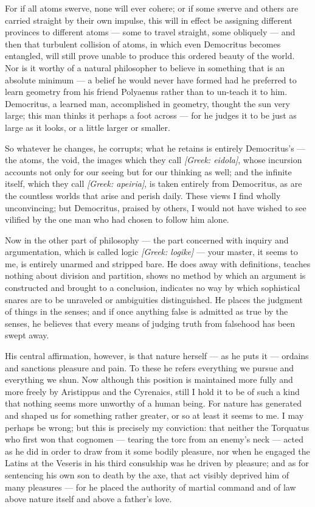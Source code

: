 For if all atoms swerve, none will ever cohere; or if some swerve and others are carried straight by their own impulse, this will in effect be assigning different provinces to different atoms — some to travel straight, some obliquely — and then that turbulent collision of atoms, in which even Democritus becomes entangled, will still prove unable to produce this ordered beauty of the world. Nor is it worthy of a natural philosopher to believe in something that is an absolute minimum — a belief he would never have formed had he preferred to learn geometry from his friend Polyaenus rather than to un-teach it to him. Democritus, a learned man, accomplished in geometry, thought the sun very large; this man thinks it perhaps a foot across — for he judges it to be just as large as it looks, or a little larger or smaller.

 So whatever he changes, he corrupts; what he retains is entirely Democritus's — the atoms, the void, the images which they call \textit{[Greek: eidola]}, whose incursion accounts not only for our seeing but for our thinking as well; and the infinite itself, which they call \textit{[Greek: apeiria]}, is taken entirely from Democritus, as are the countless worlds that arise and perish daily. These views I find wholly unconvincing; but Democritus, praised by others, I would not have wished to see vilified by the one man who had chosen to follow him alone.

 Now in the other part of philosophy — the part concerned with inquiry and argumentation, which is called logic \textit{[Greek: logike]} — your master, it seems to me, is entirely unarmed and stripped bare. He does away with definitions, teaches nothing about division and partition, shows no method by which an argument is constructed and brought to a conclusion, indicates no way by which sophistical snares are to be unraveled or ambiguities distinguished. He places the judgment of things in the senses; and if once anything false is admitted as true by the senses, he believes that every means of judging truth from falsehood has been swept away.

 His central affirmation, however, is that nature herself — as he puts it — ordains and sanctions pleasure and pain. To these he refers everything we pursue and everything we shun. Now although this position is maintained more fully and more freely by Aristippus and the Cyrenaics, still I hold it to be of such a kind that nothing seems more unworthy of a human being. For nature has generated and shaped us for something rather greater, or so at least it seems to me. I may perhaps be wrong; but this is precisely my conviction: that neither the Torquatus who first won that cognomen — tearing the torc from an enemy's neck — acted as he did in order to draw from it some bodily pleasure, nor when he engaged the Latins at the Veseris in his third consulship was he driven by pleasure; and as for sentencing his own son to death by the axe, that act visibly deprived him of many pleasures — for he placed the authority of martial command and of law above nature itself and above a father's love.

